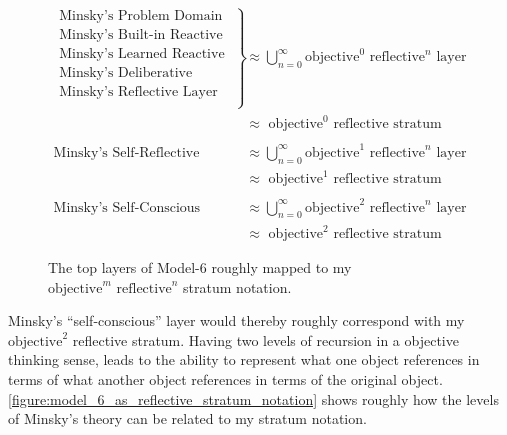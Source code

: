 \begin{figure}[bth]
  \begin{align*}
    \left.
    \begin{array}{l}
      \text{Minsky's Problem Domain }\\
      \text{Minsky's Built-in Reactive Layer }\\
      \text{Minsky's Learned Reactive Layer }\\
      \text{Minsky's Deliberative Layer }\\
      \text{Minsky's Reflective Layer }\\
    \end{array}
    \right\}                               &{\approx} \bigcup_{n=0}^{\infty}{\text{objective}^0\text{ reflective}^n\text{ layer}} \\
                                           &{\approx} \text{ objective}^0\text{ reflective stratum} \\
  \end{align*}
  \begin{align*}
    \text{Minsky's Self-Reflective Layer } &{\approx} \bigcup_{n=0}^{\infty}{\text{objective}^1\text{ reflective}^n\text{ layer}} \\
                                           &{\approx} \text{ objective}^1\text{ reflective stratum} \\
  \end{align*}
  \begin{align*}
    \text{Minsky's Self-Conscious Layer }  &{\approx} \bigcup_{n=0}^{\infty}{\text{objective}^2\text{ reflective}^n\text{ layer}} \\
                                           &{\approx} \text{ objective}^2\text{ reflective stratum}
  \end{align*}
\caption{The top layers of Model-6 roughly mapped to my
  $\text{objective}^m\text{ reflective}^n$ stratum notation.}
\label{figure:model_6_as_reflective_stratum_notation}
\end{figure}

Minsky's ``self-conscious'' layer would thereby roughly correspond
with my $\text{objective}^2$ reflective stratum.  Having two levels of
recursion in a objective thinking sense, leads to the ability to
represent what one object references in terms of what another object
references in terms of the original object.
\autoref{figure:model_6_as_reflective_stratum_notation} shows roughly
how the levels of Minsky's theory can be related to my stratum
notation.


